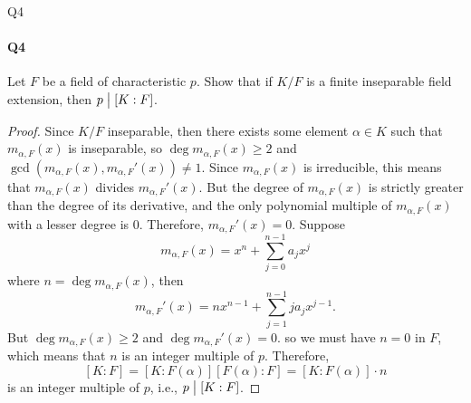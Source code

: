 \documentclass[12pt]{article}
\newenvironment{fullbox}{\begin{lrbox}{\savefullbox}\begin{minipage}{\dimexpr\textwidth-2\fboxsep\relax}}{\end{minipage}\end{lrbox}\begin{center}\framebox[\textwidth]{\usebox{\savefullbox}}\end{center}}
\newenvironment{pbox}[1][]{\begin{fullbox}\ifx#1\empty\else\paragraph{#1}\fi}{\end{fullbox}}
\theoremstyle{definition}
\newcommand{\divides}{\bigm|}
\begin{document}
\newpage
\begin{pbox}[Q4]
    Let $F$ be a field of characteristic $p$. Show that if $K/F$ is a finite inseparable field extension, then $p \divides [K : F]$.
\end{pbox}

\begin{proof}
    Since $K/F$ inseparable, then there exists some element $\alpha \in K$ such that $m_{\alpha, F}(x)$ is inseparable, so $\deg m_{\alpha, F}(x) \geq 2$ and $\gcd(m_{\alpha, F}(x), m_{\alpha, F}'(x)) \ne 1$. Since $m_{\alpha, F}(x)$ is irreducible, this means that $m_{\alpha, F}(x)$ divides $m_{\alpha, F}'(x)$. But the degree of $m_{\alpha, F}(x)$ is strictly greater than the degree of its derivative, and the only polynomial multiple of $m_{\alpha, F}(x)$ with a lesser degree is $0$. Therefore, $m_{\alpha, F}'(x) = 0$. Suppose
    \[
        m_{\alpha, F}(x) = x^{n} + \sum_{j=0}^{n-1} a_jx^{j}
    \]
    where $n = \deg m_{\alpha, F}(x)$, then
    \[
        m_{\alpha, F}'(x) = nx^{n-1} + \sum_{j=1}^{n-1} ja_jx^{j-1}.
    \]
    But $\deg m_{\alpha, F}(x) \geq 2$ and $\deg m_{\alpha, F}'(x) = 0$. so we must have $n = 0$ in $F$, which means that $n$ is an integer multiple of $p$. Therefore,
    \[
        [K : F] = [K : F(\alpha)][F(\alpha) : F] = [K : F(\alpha)] \cdot n
    \]
    is an integer multiple of $p$, i.e., $p \divides [K : F]$.
    
    

\end{proof}
\end{document}
